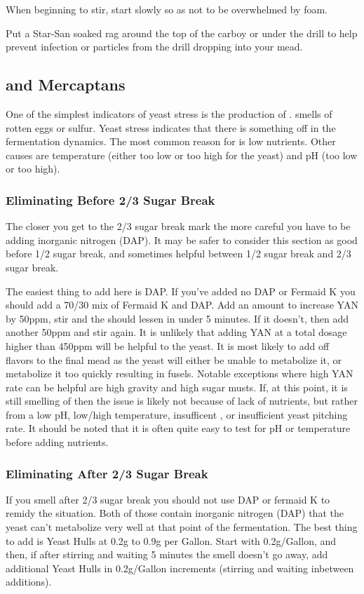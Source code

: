    When beginning to stir, start slowly so as not to be overwhelmed by foam. 

   Put a Star-San soaked rag around the top of the carboy or under the drill to help prevent infection or particles 
   from the drill dropping into your mead.

 \subsection{ and Mercaptans}
  One of the simplest indicators of yeast stress is the production of .  smells of rotten eggs or 
  sulfur. Yeast stress indicates that there is something off in the fermentation dynamics. The most common reason 
  for  is low nutrients. Other causes are temperature (either too low or too high for the yeast) and pH 
  (too low or too high).

  \subsubsection{Eliminating Before 2/3 Sugar Break}
   The closer you get to the 2/3 sugar break mark the more careful you have to be adding inorganic nitrogen (DAP). 
   It may be safer to consider this section as good before 1/2 sugar break, and sometimes helpful between 1/2 sugar
   break and 2/3 sugar break.

   The easiest thing to add here is DAP. If you've added no DAP or Fermaid K you should add a 70/30 mix of Fermaid K
   and DAP. Add an amount to increase YAN by 50ppm, stir and the 
    should lessen in under 5 minutes. If it doesn't, then add another 50ppm and stir again. It is unlikely
   that adding YAN at a total dosage higher than 450ppm will be helpful to the yeast. 
   It is most likely to add off flavors to the final mead as the yeast will either be unable to metabolize it, 
   or metabolize it too quickly resulting in fusels. 
   Notable exceptions where high YAN rate can be helpful are high gravity and high sugar musts.
   If, at this point, it is still smelling of  then the issue is likely not because of lack of nutrients, 
   but rather from a low pH, low/high temperature, insufficent , or insufficient yeast pitching rate. 
   It should be noted that it is often quite easy to test for pH or temperature before adding nutrients.

  \subsubsection{Eliminating After 2/3 Sugar Break} 
   If you smell  after 2/3 sugar break you should not use DAP or fermaid K to remidy the situation. Both of
   those contain inorganic nitrogen (DAP) that the yeast can't metabolize very well at that point of the 
   fermentation. The best thing to add is Yeast Hulls at 0.2g to 0.9g per Gallon. Start with 0.2g/Gallon, and
   then, if after stirring and waiting 5 minutes the  smell doesn't go away, add additional Yeast Hulls 
   in 0.2g/Gallon increments (stirring and waiting inbetween additions).

